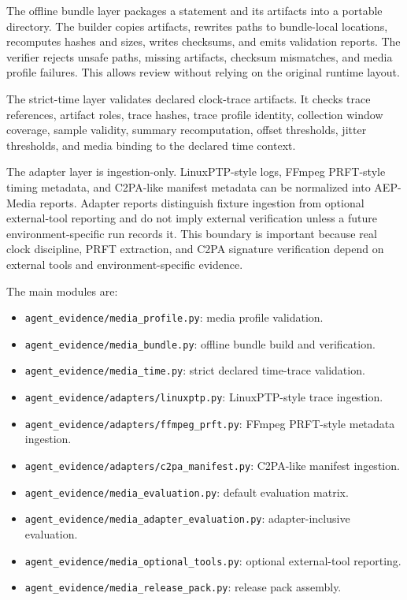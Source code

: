\documentclass[
]{article}
\providecommand{\tightlist}{%
  \setlength{\itemsep}{0pt}\setlength{\parskip}{0pt}}
\begin{document}
The offline bundle layer packages a statement and its artifacts into a
portable directory. The builder copies artifacts, rewrites paths to
bundle-local locations, recomputes hashes and sizes, writes checksums,
and emits validation reports. The verifier rejects unsafe paths, missing
artifacts, checksum mismatches, and media profile failures. This allows
review without relying on the original runtime layout.

The strict-time layer validates declared clock-trace artifacts. It
checks trace references, artifact roles, trace hashes, trace profile
identity, collection window coverage, sample validity, summary
recomputation, offset thresholds, jitter thresholds, and media binding
to the declared time context.

The adapter layer is ingestion-only. LinuxPTP-style logs, FFmpeg
PRFT-style timing metadata, and C2PA-like manifest metadata can be
normalized into AEP-Media reports. Adapter reports distinguish fixture
ingestion from optional external-tool reporting and do not imply
external verification unless a future environment-specific run records
it. This boundary is important because real clock discipline, PRFT
extraction, and C2PA signature verification depend on external tools and
environment-specific evidence.

The main modules are:

\begin{itemize}
\tightlist
\item
  \texttt{agent\_evidence/media\_profile.py}: media profile validation.
\item
  \texttt{agent\_evidence/media\_bundle.py}: offline bundle build and
  verification.
\item
  \texttt{agent\_evidence/media\_time.py}: strict declared time-trace
  validation.
\item
  \texttt{agent\_evidence/adapters/linuxptp.py}: LinuxPTP-style trace
  ingestion.
\item
  \texttt{agent\_evidence/adapters/ffmpeg\_prft.py}: FFmpeg PRFT-style
  metadata ingestion.
\item
  \texttt{agent\_evidence/adapters/c2pa\_manifest.py}: C2PA-like
  manifest ingestion.
\item
  \texttt{agent\_evidence/media\_evaluation.py}: default evaluation
  matrix.
\item
  \texttt{agent\_evidence/media\_adapter\_evaluation.py}:
  adapter-inclusive evaluation.
\item
  \texttt{agent\_evidence/media\_optional\_tools.py}: optional
  external-tool reporting.
\item
  \texttt{agent\_evidence/media\_release\_pack.py}: release pack
  assembly.
\end{itemize}
\end{document}
